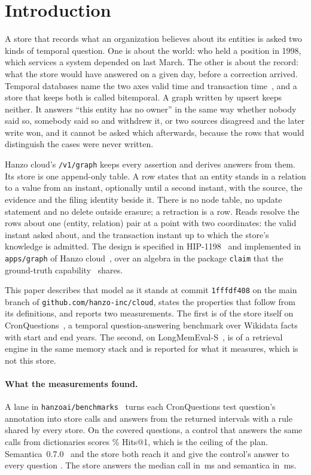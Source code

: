 \section{Introduction}
\label{sec:intro}

A store that records what an organization believes about its entities is asked
two kinds of temporal question. One is about the world: who held a position in
1998, which services a system depended on last March. The other is about the
record: what the store would have answered on a given day, before a correction
arrived. Temporal databases name the two axes valid time and transaction
time~\cite{snodgrass1985taxonomy,jensen1998glossary}, and a store that keeps
both is called bitemporal. A graph written by upsert keeps neither. It answers
``this entity has no owner'' in the same way whether nobody said so, somebody
said so and withdrew it, or two sources disagreed and the later write won, and
it cannot be asked which afterwards, because the rows that would distinguish
the cases were never written.

Hanzo cloud's \texttt{/v1/graph} keeps every assertion and derives answers from
them. Its store is one append-only table. A row states that an entity stands in
a relation to a value from an instant, optionally until a second instant, with
the source, the evidence and the filing identity beside it. There is no node
table, no update statement and no delete outside erasure; a retraction is a
row. Reads resolve the rows about one (entity, relation) pair at a point with
two coordinates: the valid instant asked about, and the transaction instant up
to which the store's knowledge is admitted. The design is specified in
HIP-1198~\cite{hip1198} and implemented in \texttt{apps/graph} of Hanzo
cloud~\cite{hanzocloud}, over an algebra in the package \texttt{claim} that the
ground-truth capability~\cite{hip1261} shares.

This paper describes that model as it stands at commit \texttt{1fffdf408} on
the main branch of \texttt{github.com/hanzo-inc/cloud}, states the properties
that follow from its definitions, and reports two measurements. The first is of
the store itself on CronQuestions~\cite{saxena2021cronquestions}, a temporal
question-answering benchmark over Wikidata facts with start and end years. The
second, on LongMemEval-S~\cite{wu2025longmemeval}, is of a retrieval engine in
the same memory stack and is reported for what it measures, which is not this
store.

\paragraph{What the measurements found.}
A lane in \texttt{hanzoai/benchmarks}~\cite{hanzobenchmarks} turns each
CronQuestions test question's annotation into store calls and answers from the
returned intervals with a rule shared by every store. On the
 covered questions, a control that answers the same calls from
dictionaries scores \% Hits@1, which is the ceiling of the
plan. Semantica~0.7.0~\cite{semantica} and the store both reach it and give the
control's answer to every question \meas{}. The store answers the median call in
\,ms and semantica in \,ms.

